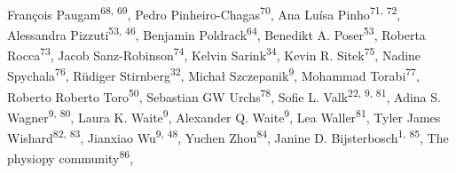 \documentclass[10pt,a4paper,twocolumns]{proc}
\begin{document}
{François Paugam\textsuperscript{68, 69}, %
Pedro Pinheiro-Chagas\textsuperscript{70}, %
Ana Luísa Pinho\textsuperscript{71, 72}, %
Alessandra Pizzuti\textsuperscript{53, 46}, %
Benjamin Poldrack\textsuperscript{64}, %
Benedikt A. Poser\textsuperscript{53}, %
Roberta Rocca\textsuperscript{73}, %
Jacob Sanz-Robinson\textsuperscript{74}, %
Kelvin Sarink\textsuperscript{34}, %
Kevin R. Sitek\textsuperscript{75}, %
Nadine Spychala\textsuperscript{76}, %
Rüdiger Stirnberg\textsuperscript{32}, %
Michał Szczepanik\textsuperscript{9}, %
Mohammad Torabi\textsuperscript{77}, %
Roberto Roberto Toro\textsuperscript{50}, %
Sebastian GW Urchs\textsuperscript{78}, %
Sofie L. Valk\textsuperscript{22, 9, 81}, %
Adina S. Wagner\textsuperscript{9, 80}, %
Laura K. Waite\textsuperscript{9}, %
Alexander Q. Waite\textsuperscript{9}, %
Lea Waller\textsuperscript{81}, %
Tyler James Wishard\textsuperscript{82, 83}, %
Jianxiao Wu\textsuperscript{9, 48}, %
Yuchen Zhou\textsuperscript{84}, %
Janine D. Bijsterbosch\textsuperscript{1, 85}, %
The physiopy community\textsuperscript{86}, %
}
\\
\end{document}
